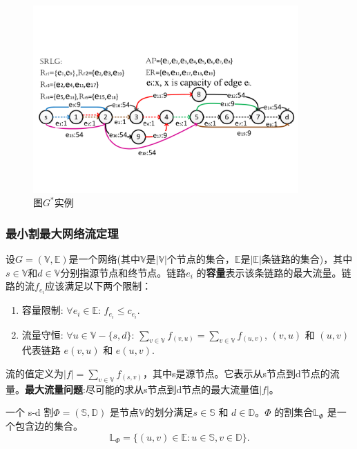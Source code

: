 \begin{figure}[tp]
  \centering
  \includegraphics[width=4.0in]{figures/FlowStarGraph}
  \caption{图$G^*$实例}\label{fig:FlowStarGraph}
\end{figure}



\subsubsection{最小割最大网络流定理}
\label{subsubsec:maxFlow}
设$G=(\mathbb{\mathbb{V}},\mathbb{\mathbb{E}})$是一个网络(其中$\mathbb{\mathbb{V}}$是$|\mathbb{\mathbb{V}}|$个节点的集合，$\mathbb{\mathbb{E}}$是$|\mathbb{\mathbb{E}}|$条链路的集合)，其中$s\in \mathbb{V}$和$d\in \mathbb{V}$分别指源节点和终节点。链路$e_i$ 的\textbf{容量}表示该条链路的最大流量。链路的流$f_{e_i}$应该满足以下两个限制：
\begin{enumerate}
  \item 容量限制: $\forall e_i\in \mathbb{\mathbb{E}}$: $f_{e_i}\leq c_{e_i}$.
  \item 流量守恒: $\forall u\in \mathbb{\mathbb{V}}-\{s,d\}$: $\sum\limits_{v\in \mathbb{V}}f_{(v,u)}=\sum\limits_{v\in \mathbb{V}}f_{(u,v)}$,  $(v,u)$ 和 $(u,v)$ 代表链路 $e(v,u)$ 和 $e(u,v)$.
\end{enumerate}

流的值定义为$|f|=\sum\limits_{v\in \mathbb{V}}f_{(s,v)}$，其中s是源节点。它表示从s节点到d节点的流量。\textbf{最大流量问题}:尽可能的求从s节点到d节点的最大流量值$|f|$。

一个 s-d 割${\Phi}=(\mathbb{S},\mathbb{D})$ 是节点$\mathbb{V}$的划分满足$s \in \mathbb{S}$ 和 $d \in \mathbb{D}$。$\Phi$ 的割集合$\mathbb{\mathbb{L}}_{\Phi}$ 是一个包含边的集合。
\begin{equation}
\mathbb{\mathbb{L}}_{\Phi}=\{(u,v)\in \mathbb{E}: u \in \mathbb{S}, v \in \mathbb{D}\}.
\end{equation}

